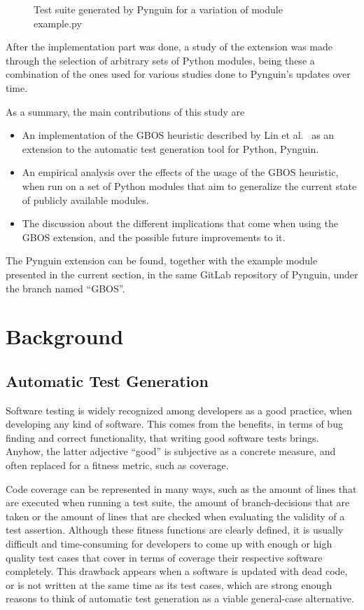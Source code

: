 \documentclass[%
  chapterprefix=false,%
  open=right,%
  twoside=true,%
  paper=a4,%
  logofile={Figures/logo.png},%
  thesistype=master,%
  UKenglish,%
]{se2thesis}
\begin{document}
\begin{figure}
  \inputminted[linenos]{python}{Figures/test2.py}
  \caption{Test suite generated by Pynguin for a variation of module example.py\label{lst:5}}
\end{figure}

After the implementation part was done, a study of the extension was made through the selection of arbitrary sets of Python modules, being these a combination of the ones used for various studies done to Pynguin's updates over time.

As a summary, the main contributions of this study are

\begin{itemize}
  \item An implementation of the GBOS heuristic described by Lin et al.~\cite{DBLP:conf/sigsoft/0001O00D21} as an extension to the automatic test generation tool for Python, Pynguin.
  \item An empirical analysis over the effects of the usage of the GBOS heuristic, when run on a set of Python modules that aim to generalize the current state of publicly available modules.
  \item The discussion about the different implications that come when using the GBOS extension, and the possible future improvements to it.
\end{itemize}

The Pynguin extension can be found, together with the example module presented in the current section, in the same GitLab repository of Pynguin, under the branch named ``GBOS''.

\chapter{Background}\label{chap:background}

\section{Automatic Test Generation}

Software testing is widely recognized among developers as a good practice, when developing any kind of software.
This comes from the benefits, in terms of bug finding and correct functionality, that writing good software tests brings.
Anyhow, the latter adjective ``good'' is subjective as a concrete measure, and often replaced for a fitness metric, such as coverage.

Code coverage can be represented in many ways, such as the amount of lines that are executed when running a test suite, the amount of branch-decisions that are taken or the amount of lines that are checked when evaluating the validity of a test assertion.
Although these fitness functions are clearly defined, it is usually difficult and time-consuming for developers to come up with enough or high quality test cases that cover in terms of coverage their respective software completely.
This drawback appears when a software is updated with dead code, or is not written at the same time as its test cases, which are strong enough reasons to think of automatic test generation as a viable general-case alternative.
\end{document}
